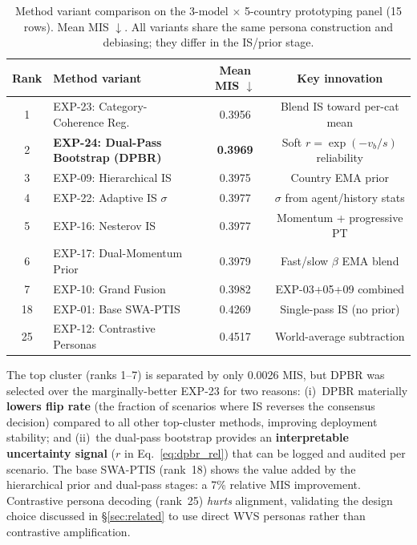 \documentclass{article}
\begin{document}
\begin{table}[h]\centering\scriptsize
\caption{Method variant comparison on the 3-model $\times$ 5-country prototyping
panel (15 rows). Mean MIS $\downarrow$. All variants share the same persona
construction and debiasing; they differ in the IS/prior stage.}
\label{tab:engineering}
\setlength{\tabcolsep}{4pt}
\begin{tabular}{clcc}\toprule
Rank & Method variant & Mean MIS $\downarrow$ & Key innovation \\\midrule
1 & EXP-23: Category-Coherence Reg. & 0.3956 & Blend IS toward per-cat mean \\
2 & \textbf{EXP-24: Dual-Pass Bootstrap (DPBR)} & \textbf{0.3969} & Soft $r{=}\exp(-v_b/s)$ reliability \\
3 & EXP-09: Hierarchical IS & 0.3975 & Country EMA prior \\
4 & EXP-22: Adaptive IS $\sigma$ & 0.3977 & $\sigma$ from agent/history stats \\
5 & EXP-16: Nesterov IS & 0.3977 & Momentum + progressive PT \\
6 & EXP-17: Dual-Momentum Prior & 0.3979 & Fast/slow $\beta$ EMA blend \\
7 & EXP-10: Grand Fusion & 0.3982 & EXP-03+05+09 combined \\
\midrule
18 & EXP-01: Base SWA-PTIS & 0.4269 & Single-pass IS (no prior) \\
25 & EXP-12: Contrastive Personas & 0.4517 & World-average subtraction \\
\bottomrule
\end{tabular}
\end{table}

The top cluster (ranks 1--7) is separated by only 0.0026 MIS, but DPBR was
selected over the marginally-better EXP-23 for two reasons:
(i)~DPBR materially \textbf{lowers flip rate} (the fraction of scenarios where IS
reverses the consensus decision) compared to all other top-cluster methods,
improving deployment stability; and
(ii)~the dual-pass bootstrap provides an \textbf{interpretable uncertainty signal}
($r$ in Eq.~\ref{eq:dpbr_rel}) that can be logged and audited per scenario.
The base SWA-PTIS (rank~18) shows the value added by the hierarchical
prior and dual-pass stages: a 7\% relative MIS improvement.
Contrastive persona decoding (rank~25) \emph{hurts} alignment, validating the
design choice discussed in \S\ref{sec:related} to use direct WVS personas
rather than contrastive amplification.

\end{document}
